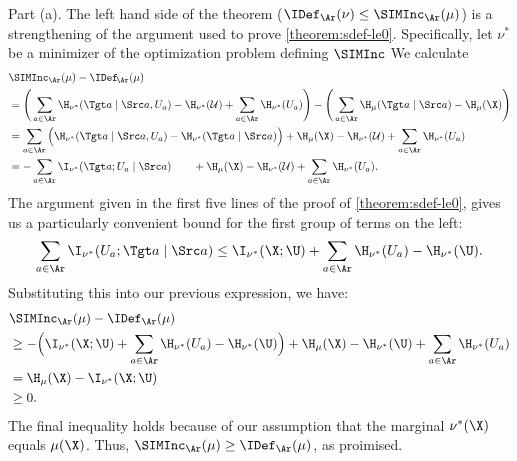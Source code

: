 \begin{subappendices}
\begin{lproof}
        \label{proof:siminc-idef-bounds}
    Part (a).  The left hand side of the theorem 
    ($\IDef_{\Ar}(\nu)\le\SIMInc_{\Ar}(\mu)$)
    is a strengthening of the argument used to prove \cref{theorem:sdef-le0}. 
    Specifically,
    let $\nu^*$ be a minimizer of 
        the optimization problem defining $\SIMInc$
    We calculate
    \allowdisplaybreaks
    \begin{align*}
        &\SIMInc_{\Ar}(\mu) - \IDef_{\!\Ar}(\mu) 
        \\
        &= \left( \,
        \sum_{a \in \Ar} \H_{\nu^*}(\Tgt a \mid \Src a, U_a) - \H_{\nu^*}(\mathcal U) + \sum_{a \in \Ar} \H_{\nu^*}(U_a)
        \right) - \left(\,
        \sum_{a \in \Ar}\H_\mu(\Tgt a \mid \Src a) - \H_\mu(\X) \right)\\
        &=
        \sum_{a \in \Ar} \Big( \H_{\nu^*}(\Tgt a \mid \Src a, U_a) - \H_{\nu^*}(\Tgt a \mid \Src a) \Big)
            + \H_\mu(\X)
            - \H_{\nu^*}(\mathcal U) + \sum_{a \in \Ar} \H_{\nu^*}(U_a)
        \\
        &=
        - \sum_{a \in \Ar} \I_{\nu^*}( \Tgt a ; U_a \mid \Src a)
            \qquad + \H_\mu(\X)
            - \H_{\nu^*}(\mathcal U) + \sum_{a \in \Ar} \H_{\nu^*}(U_a).
    \end{align*}
    The argument given in the first five lines of the proof of \cref{theorem:sdef-le0}, gives us a particularly convenient bound for the first group of terms on the left:
    \[
        \sum_{a \in \Ar} \I_{\nu^*} (U_a ; \Tgt a\mid \Src a) 
        \le \I_{\nu^*}(\X; \U) + \sum_{a \in \Ar} \H_{\nu^*}(U_a) - \H_{\nu^*}(\U).
    \]
    Substituting this into our previous expression, we have:
    \begin{align*}
        &\SIMInc_{\Ar}(\mu) - \IDef_{\Ar}(\mu) 
        \\
        &\ge - \Big(\I_{\nu^*}(\X; \U) + \sum_{a \in \Ar} \H_{\nu^*}(U_a) - \H_{\nu^*}(\U) \Big)
            + \H_\mu(\X) - \H_{\nu^*}(\U) + \sum_{a \in \Ar} \H_{\nu^*}(U_a)
        \\
        &= \H_\mu(\X) - \I_{\nu^*}(\X ; \U)
        \\
        &\ge 0. 
    \end{align*}
    The final inequality holds because of our assumption that the marginal $\nu^*(\X)$ equals $\mu(\X)$. 
    Thus, $\SIMInc_{\Ar}(\mu) \ge \IDef_{\Ar}(\mu)$, as proimised.


\end{lproof}
\end{subappendices}
